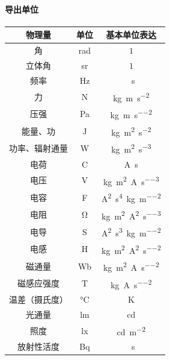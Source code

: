 \paragraph{导出单位}
\begin{notecaptionblock}
	\begin{tabular}{ccc}
		\toprule
		物理量&单位&基本单位表达\\
		\midrule
		角&\unit{\radian}&$1$\\
		立体角&\unit{\steradian}&$1$\\
		频率&\unit{\hertz}&\unit{\per\second}\\
		力&\unit{\newton}&\unit{\kilogram\metre\per\second\squared}\\
		压强&\unit{\pascal}&\unit{\kilogram\per\metre\per\second\squared}\\
		能量、功&\unit{\joule}&\unit{\kilogram\metre\squared\per\second\squared}\\
		功率、辐射通量&\unit{\watt}&\unit{\kilogram\metre\squared\per\second\cubed}\\
		电荷&\unit{\coulomb}&\unit{\ampere\second}\\
		电压&\unit{\volt}&\unit{\kilogram\metre\squared\per\ampere\per\second\cubed}\\
		电容&\unit{\farad}&\unit{\ampere\squared\second\tothe{4}\per\kilogram\per\metre\squared}\\
		电阻&\unit{\ohm}&\unit{\kilogram\metre\squared\per\ampere\squared\per\second\cubed}\\
		电导&\unit{\siemens}&\unit{\ampere\squared\second\cubed\per\kilogram\per\metre\squared}\\
		电感&\unit{\henry}&\unit{\kilogram\metre\squared\per\ampere\squared\per\second\squared}\\
		磁通量&\unit{\weber}&\unit{\kilogram\metre\squared\per\ampere\per\second\squared}\\
		磁感应强度&\unit{\tesla}&\unit{\kilogram\per\ampere\per\second\squared}\\
		温差（摄氏度）&\unit{\degreeCelsius}&\unit{\kelvin}\\
		光通量&\unit{\lumen}&\unit{\candela}\\
		照度&\unit{\lux}&\unit{\candela\per\metre\squared}\\
		放射性活度&\unit{\becquerel}&\unit{\per\second}\\
		\bottomrule
	\end{tabular}
\end{notecaptionblock}
